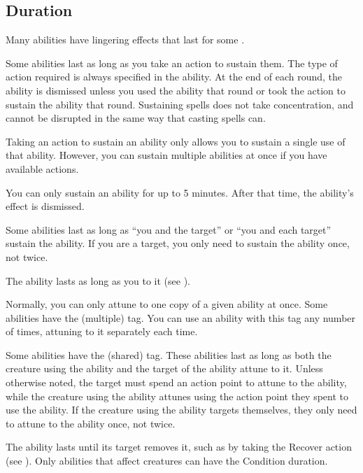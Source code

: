     \subsection{Duration}

        Many abilities have lingering effects that last for some .

        \label{Sustain} Some abilities last as long as you take an action to sustain them.
        The type of action required is always specified in the ability.
        At the end of each round, the ability is dismissed unless you used the ability that round or took the action to sustain the ability that round.
        Sustaining spells does not take concentration, and cannot be disrupted in the same way that casting spells can.

        Taking an action to sustain an ability only allows you to sustain a single use of that ability.
        However, you can sustain multiple abilities at once if you have available actions.

        You can only sustain an ability for up to 5 minutes.
        After that time, the ability's effect is dismissed.

         Some abilities last as long as ``you and the target'' or ``you and each target'' sustain the ability.
        If you are a target, you only need to sustain the ability once, not twice.

         The ability lasts as long as you  to it (see ).

         Normally, you can only attune to one copy of a given ability at once.
        Some abilities have the  (multiple) tag.
        You can use an ability with this tag any number of times, attuning to it separately each time.

         Some abilities have the  (shared) tag.
        These abilities last as long as both the creature using the ability and the target of the ability attune to it.
        Unless otherwise noted, the target must spend an action point to attune to the ability, while the creature using the ability attunes using the action point they spent to use the ability.
        If the creature using the ability targets themselves, they only need to attune to the ability once, not twice.

         The ability lasts until its target removes it, such as by taking the Recover action (see ).
        Only abilities that affect creatures can have the Condition duration.

